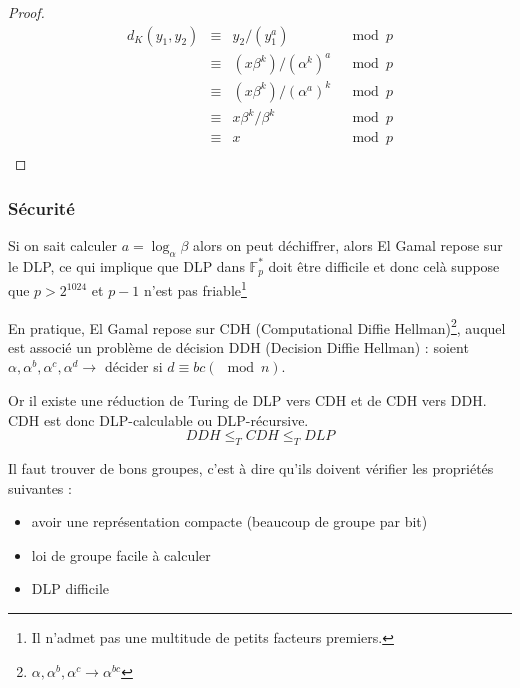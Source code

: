 \documentclass[a4paper, 10pt]{thesis}
\begin{document}
\begin{proof}
    \begin{displaymath}
        \begin{array}{rcll}
            d_K(y_1, y_2) & \equiv & y_2 / (y_1^a) & \mod p \\
                          & \equiv & (x\beta ^k) / (\alpha^k)^a & \mod p \\
                          & \equiv & (x\beta^k) / (\alpha^a)^k & \mod p \\
                          & \equiv & x \beta^k / \beta^k & \mod p \\
                          & \equiv & x & \mod p \\
        \end{array}
    \end{displaymath}
\end{proof}

\subsubsection*{Sécurité}

Si on sait calculer $a = \log_{\alpha} \beta$ alors on peut déchiffrer, alors El Gamal repose sur le
DLP, ce qui implique que DLP dans $\mathbb{F}_p^*$ doit être difficile et donc celà suppose que $p >
2^{1024}$ et $p-1$ n'est pas friable\footnote{Il n'admet pas une multitude de petits facteurs
premiers.}

En pratique, El Gamal repose sur CDH (Computational Diffie Hellman)\footnote{$\alpha, \alpha^b,
\alpha^c \longrightarrow \alpha^{bc}$}, auquel est associé un problème de décision DDH (Decision
Diffie Hellman) : soient $\alpha, \alpha^b, \alpha^c, \alpha^d \rightarrow $ décider si $d \equiv bc
(\mod n)$.

Or il existe une réduction de Turing de DLP vers CDH et de CDH vers DDH. CDH est donc DLP-calculable
ou DLP-récursive.
\begin{displaymath}
    DDH \leq_T CDH \leq_T DLP
\end{displaymath}

\begin{rmq}
    Il faut trouver de bons groupes, c'est à dire qu'ils doivent vérifier les propriétés suivantes :
    \begin{itemize}
        \item avoir une représentation compacte (beaucoup de groupe par bit)
        \item loi de groupe facile à calculer 
        \item DLP difficile
    \end{itemize}
\end{rmq}
\end{document}
